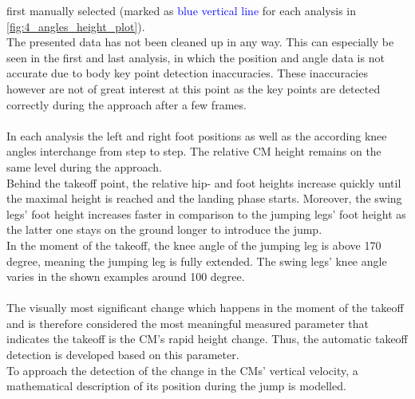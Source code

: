 first manually selected (marked as \textcolor{blue}{blue vertical line} for
each analysis in \autoref{fig:4_angles_height_plot}).\\
The presented data has not been cleaned up in any way.
This can especially be seen in the first and last analysis, in which the
position and angle data is not accurate due to body key point detection
inaccuracies.
These inaccuracies however are not of great interest at this point as the key
points are detected correctly during the approach after a few frames.\\\\
In each analysis the left and right foot positions as well as the
according knee angles interchange from step to step.
The relative \ac{CM} height remains on the same level during the approach.\\
Behind the takeoff point, the relative hip- and foot heights increase quickly
until the maximal height is reached and the landing phase starts.
Moreover, the swing legs' foot height increases faster in comparison to the
jumping legs' foot height as the latter one stays on the ground longer to
introduce the jump.\\
In the moment of the takeoff, the knee angle of the jumping leg is above 170
degree, meaning the jumping leg is fully extended.
The swing legs' knee angle varies in the shown examples around 100 degree.\\\\
The visually most significant change which happens in the moment of the
takeoff and is therefore considered the most meaningful measured parameter
that indicates the takeoff is the \ac{CM}'s rapid height change.
Thus, the automatic takeoff detection is developed based on this parameter.\\
To approach the detection of the change in the \ac{CM}s' vertical
velocity, a mathematical description of its position during the jump is
modelled.

